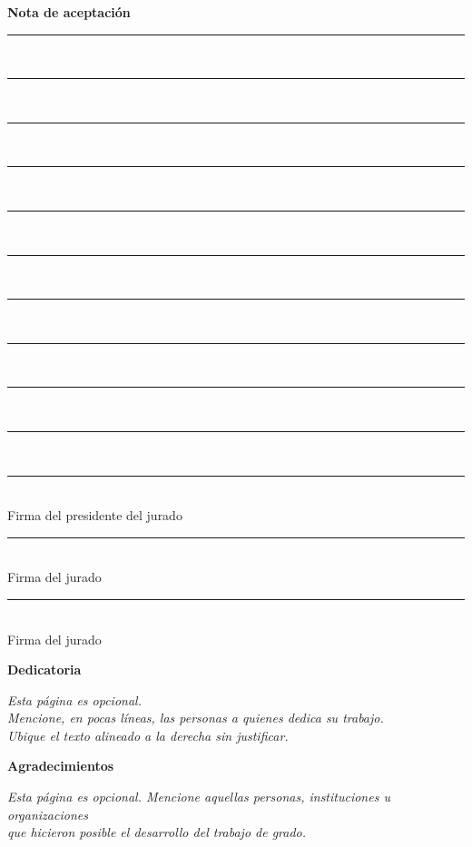 \documentclass[12pt, letterpaper]{article}
\begin{document}
\newpage
\thispagestyle{empty}
\begin{center}
    \vspace*{3cm}
    {\large \bfseries Nota de aceptación\par}
    \vspace{2cm}
    \rule{10cm}{0.4pt}\\[0.3cm]
    \rule{10cm}{0.4pt}\\[0.3cm]
    \rule{10cm}{0.4pt}\\[0.3cm]
    \rule{10cm}{0.4pt}\\[0.3cm]
    \rule{10cm}{0.4pt}\\[0.3cm]
    \rule{10cm}{0.4pt}\\[0.3cm]
    \rule{10cm}{0.4pt}\\[0.3cm]
    \rule{10cm}{0.4pt}\\[0.3cm]
    \rule{10cm}{0.4pt}\\[0.3cm]
    \rule{10cm}{0.4pt}\\[1.5cm]
    \rule{8cm}{0.4pt}\\
    Firma del presidente del jurado\\[1.2cm]
    \rule{8cm}{0.4pt}\\
    Firma del jurado\\[1.2cm]
    \rule{8cm}{0.4pt}\\
    Firma del jurado
\end{center}

\newpage
\thispagestyle{empty}
\begin{flushright}
    \vspace*{3cm}
    {\large \bfseries Dedicatoria\par}
    \vspace{2cm}
    \textit{Esta página es opcional.\\
    Mencione, en pocas líneas, las personas a quienes dedica su trabajo.\\
    Ubique el texto alineado a la derecha sin justificar.}
\end{flushright}

\newpage
\thispagestyle{empty}
\begin{center}
    \vspace*{3cm}
    {\large \bfseries Agradecimientos\par}
    \vspace{2cm}
    \textit{Esta página es opcional. Mencione aquellas personas, instituciones u organizaciones\\
    que hicieron posible el desarrollo del trabajo de grado.}
\end{center}
\end{document}
